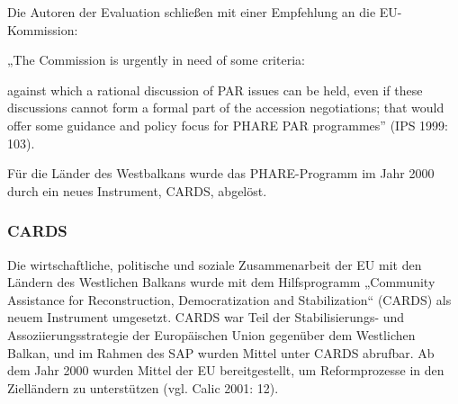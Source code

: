 Die Autoren der Evaluation schließen mit einer Empfehlung an die EU-Kommission: 

„The Commission is urgently in need of some criteria:

against which a rational discussion of PAR issues can be held, even if these discussions cannot form a formal part of the accession negotiations;
that would offer some guidance and policy focus for PHARE PAR programmes” (IPS 1999: 103).\par
Für die Länder des Westbalkans wurde das PHARE-Programm im Jahr 2000 durch ein neues Instrument, CARDS, abgelöst.


\subsubsection{CARDS} 

Die wirtschaftliche, politische und soziale Zusammenarbeit der EU mit den Ländern des Westlichen Balkans wurde mit dem Hilfsprogramm „Community Assistance for Reconstruction, Democratization and Stabilization“ (CARDS) als neuem Instrument umgesetzt. CARDS war Teil der Stabilisierungs- und Assoziierungsstrategie der Europäischen Union gegenüber dem Westlichen Balkan, und im Rahmen des SAP wurden Mittel unter CARDS abrufbar. Ab dem Jahr 2000 wurden Mittel der EU bereitgestellt, um Reformprozesse in den Zielländern zu unterstützen (vgl. Calic 2001: 12).\par

